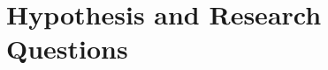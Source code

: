 
\chapter{Hypothesis and Research Questions} %

\label{Chapter:HypothesisandResearchQuestions}






